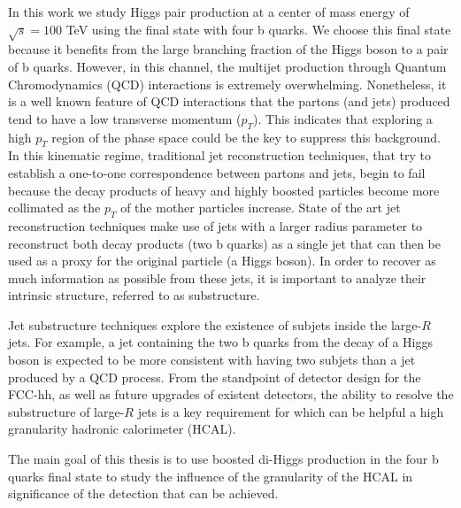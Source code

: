 In this work we study Higgs pair production at a center of mass energy of $\sqrt{s}=100$ TeV using the final state with four b quarks. We choose this final state because it benefits from the large branching fraction of the Higgs boson to a pair of b quarks. However, in this channel, the multijet production through Quantum Chromodynamics (QCD) interactions is extremely overwhelming. Nonetheless, it is a well known feature of QCD interactions that the partons (and jets) produced tend to have a low transverse momentum ($p_T$). This indicates that exploring a high $p_T$ region of the phase space could be the key to suppress this background. In this kinematic regime, traditional jet reconstruction techniques, that try to establish a one-to-one correspondence between partons and jets, begin to fail because the decay products of heavy and highly boosted particles become more collimated as the $p_T$ of the mother particles increase. State of the art jet reconstruction techniques make use of jets with a larger radius parameter to reconstruct both decay products (two b quarks) as a single jet that can then be used as a proxy for the original particle (a Higgs boson). In order to recover as much information as possible from these jets, it is important to analyze their intrinsic structure, referred to as substructure. 

Jet substructure techniques explore the existence of subjets inside the large-$R$ jets. For example, a jet containing the two b quarks from the decay of a Higgs boson is expected to be more consistent with having two subjets than a jet produced by a QCD process. From the standpoint of detector design for the FCC-hh, as well as future upgrades of existent detectors, the ability to resolve the substructure of large-$R$ jets is a key requirement for which can be helpful a high granularity hadronic calorimeter (HCAL).

The main goal of this thesis is to use boosted di-Higgs production in the four b quarks final state to study the influence of the granularity of the HCAL in significance of the detection that can be achieved.


